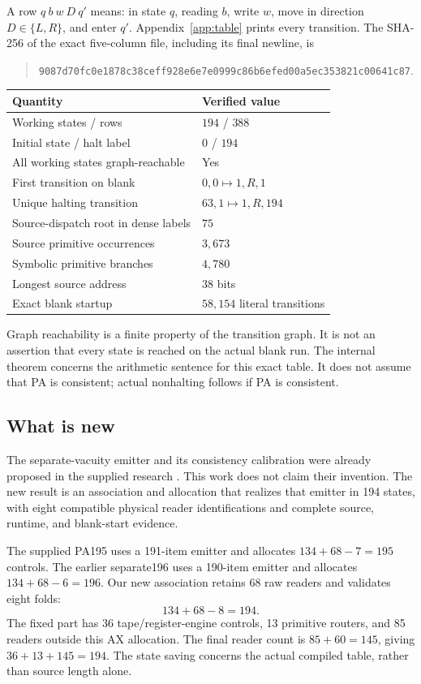 \documentclass[11pt,letterpaper]{article}
\begin{document}
A row $q\ b\ w\ D\ q'$ means: in state $q$, reading $b$, write $w$,
move in direction $D\in\{L,R\}$, and enter $q'$. Appendix~\ref{app:table}
prints every transition. The SHA-256 of the exact five-column file,
including its final newline, is
\begin{quote}\small
\nolinkurl{9087d70fc0e1878c38ceff928e6e7e0999c86b6efed00a5ec353821c00641c87}.
\end{quote}

\begin{center}
\begin{tabular}{@{}ll@{}}
\toprule
Quantity & Verified value\\
\midrule
Working states / rows & $194$ / $388$\\
Initial state / halt label & $0$ / $194$\\
All working states graph-reachable & Yes\\
First transition on blank & $0,0\mapsto 1,R,1$\\
Unique halting transition & $63,1\mapsto 1,R,194$\\
Source-dispatch root in dense labels & $75$\\
Source primitive occurrences & $3,673$\\
Symbolic primitive branches & $4,780$\\
Longest source address & $38$ bits\\
Exact blank startup & $58,154$ literal transitions\\
\bottomrule
\end{tabular}
\end{center}
Graph reachability is a finite property of the transition graph. It is
not an assertion that every state is reached on the actual blank run.
The internal theorem concerns the arithmetic sentence for this exact
table. It does not assume that PA is consistent; actual nonhalting
follows if PA is consistent.

\subsection{What is new}
The separate-vacuity emitter and its consistency calibration were
already proposed in the supplied research \cite{separate,pa195}.
This work does not claim their invention. The new result is an
association and allocation that realizes that emitter in 194 states,
with eight compatible physical reader identifications and complete
source, runtime, and blank-start evidence.

The supplied PA195 uses a 191-item emitter and allocates
$134+68-7=195$ controls. The earlier separate196 uses a 190-item emitter
and allocates $134+68-6=196$. Our new association retains 68 raw readers
and validates eight folds:
\[
\boxed{134+68-8=194.}
\]
The fixed part has 36 tape/register-engine controls, 13 primitive
routers, and 85 readers outside this AX allocation. The final reader
count is $85+60=145$, giving $36+13+145=194$. The state saving concerns
the actual compiled table, rather than source length alone.
\end{document}
